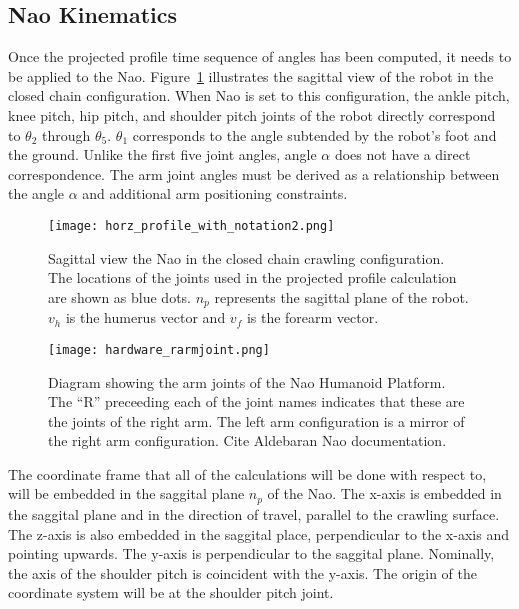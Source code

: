 \subsection{Nao Kinematics} \label{subsec:nao_kinematics}
Once the projected profile time sequence of angles has been computed, it needs to be applied to the Nao.
Figure~\ref{fig:nao_pp_view1} illustrates the sagittal view of the robot in the closed chain configuration.
When Nao is set to this configuration, the ankle pitch, knee pitch, hip pitch, and shoulder pitch joints 
of the robot directly correspond to $\theta_2$ through $\theta_5$. $\theta_1$ corresponds to the angle
subtended by the robot's foot and the ground. Unlike the first five joint angles, angle $\alpha$ does not have a
direct correspondence. The arm joint angles must be derived as a relationship between the angle $\alpha$ and additional
arm positioning constraints.

\begin{figure}
	\texttt{[image: horz\_profile\_with\_notation2.png]}
  	\caption{Sagittal view the Nao in the closed chain crawling configuration. 
  					 The locations of the joints used in the projected profile calculation are shown as blue dots. 
  					 $n_p$ represents the sagittal plane of the robot.
  					 $v_h$ is the humerus vector and $v_f$ is the forearm vector.
  					}
  	\label{fig:nao_pp_view1}
\end{figure}

\begin{figure}
	\texttt{[image: hardware\_rarmjoint.png]}
  	\caption{Diagram showing the arm joints of the Nao Humanoid Platform.
  					 The ``R'' preceeding each of the joint names indicates that these
  					 are the joints of the right arm. The left arm configuration is a mirror
  					 of the right arm configuration. Cite Aldebaran Nao documentation.
  				  }
  	\label{fig:nao_rarm_hardware1}
\end{figure}

The coordinate frame that all of the calculations will be done with respect to, will be embedded in the
saggital plane $n_p$ of the Nao. The x-axis is embedded in the saggital plane and in the direction of travel, parallel to the crawling surface. The z-axis is also embedded in the saggital place, perpendicular to the x-axis
and pointing upwards.
The y-axis is perpendicular to the saggital plane. Nominally, the axis of the shoulder pitch is coincident
with the y-axis. The origin of the coordinate system will be at the shoulder pitch joint.

